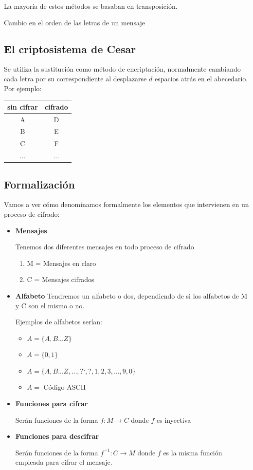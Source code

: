 		La mayoría de estos métodos se basaban en transposición.

		\begin{defn}[Transposición]
			Cambio en el orden de las letras de un mensaje
		\end{defn}

		\subsection{El criptosistema de Cesar}

			Se utiliza la sustitución como método de encriptación, normalmente cambiando cada letra por su correspondiente al desplazarse $d$ espacios atrás en el abecedario. Por ejemplo:
			\begin{center}
			\begin{tabular}[h]{c|c}
			sin cifrar & cifrado \\ \hline
			A & D\\
			B & E\\
			C & F\\
			... & ...
			\end{tabular}
			\end{center}

		\subsection{Formalización}

		Vamos a ver cómo denominamos formalmente los elementos que intervienen en un proceso de cifrado:
		\begin{itemize}
			\item \textbf{Mensajes}

			Tenemos dos diferentes mensajes en todo proceso de cifrado
			\begin{enumerate}
			\item M = Mensajes en claro
			\item C = Mensajes cifrados
		\end{enumerate}

		\item \textbf{Alfabeto}
		Tendremos un alfabeto o dos, dependiendo de si los alfabetos de M y C son el mismo o no.

		Ejemplos de alfabetos serían:
		\begin{itemize}
			\item $A = \{A,B...Z\}$
			\item $A = \{0,1\}$
			\item $A = \{A,B...Z,\hdots,\text{?`},\text{?},1,2,3,\hdots,9,0\}$
			\item $A = $ Código ASCII
		\end{itemize}

		\item \textbf{Funciones para cifrar}

		Serán funciones de la forma $f: M \rightarrow C$ donde $f$ es inyectiva

		\item \textbf{Funciones para descifrar}

		Serán funciones de la forma $f^{-1}: C \rightarrow M$ donde $f$ es la misma función empleada para cifrar el mensaje.
		\end{itemize}

